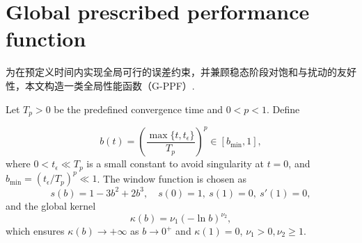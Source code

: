 \documentclass[pdflatex,sn-mathphys-num]{sn-jnl}%
\theoremstyle{thmstyleone}%
\newtheorem{lemma}{Lemma}
\theoremstyle{thmstyletwo}%
\theoremstyle{thmstylethree}%
\begin{document}



\section{Global prescribed performance function}

为在预定义时间内实现全局可行的误差约束，并兼顾稳态阶段对饱和与扰动的友好性，本文构造一类全局性能函数（G-PPF）.

Let $T_p>0$ be the predefined convergence time and $0<p<1$. Define 

 $$
 b(t)=\left(\frac{\max\{t,t_\epsilon\}}{T_p}\right)^p \in [b_{\min},1],
 $$
where $0<t_\epsilon \ll T_p$ is a small constant to avoid singularity at $t=0$, and $b_{\min}=(t_\epsilon/T_p)^p \ll 1$. The window function is chosen as
\begin{equation}\label{eq:gppf-window}
s(b)=1-3b^2+2b^3,\quad s(0)=1,\ s(1)=0,\ s'(1)=0,
\end{equation}
and the global kernel
\begin{equation}\label{eq:gppf-kernel}
\kappa(b) =\nu_1(-\ln b)^{\nu_2},   
\end{equation}
which ensures $\kappa(b)\to+\infty$ as $b\to0^+$ and $\kappa(1)=0$, $\nu_1>0, \nu_2 \geq 1$.
 
\end{document}
